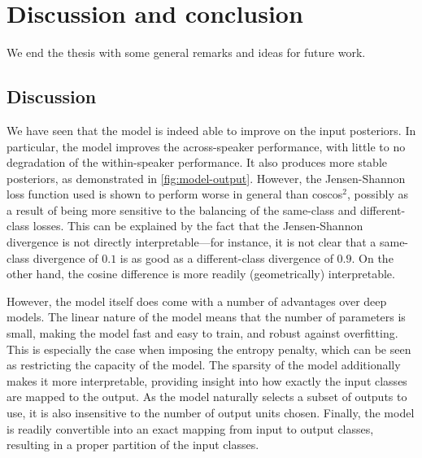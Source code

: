 %
%
%

\chapter{Discussion and conclusion}
\label{ch:discussion}

We end the thesis with some general remarks and ideas for future work.

\section{Discussion}
We have seen that the model is indeed able to improve on the input posteriors.
In particular, the model improves the across-speaker performance, with little to no degradation of the within-speaker performance.
It also produces more stable posteriors, as demonstrated in \cref{fig:model-output}.
However, the Jensen-Shannon loss function used is shown to perform worse in general than coscos$^2$, possibly as a result of being more sensitive to the balancing of the same-class and different-class losses.
This can be explained by the fact that the Jensen-Shannon divergence is not directly interpretable---for instance, it is not clear that a same-class divergence of $0.1$ is as good as a different-class divergence of $0.9$.
On the other hand, the cosine difference is more readily (geometrically) interpretable.

However, the model itself does come with a number of advantages over deep models.
The linear nature of the model means that the number of parameters is small, making the model fast and easy to train, and robust against overfitting.
This is especially the case when imposing the entropy penalty, which can be seen as restricting the capacity of the model.
The sparsity of the model additionally makes it more interpretable, providing insight into how exactly the input classes are mapped to the output.
As the model naturally selects a subset of outputs to use, it is also insensitive to the number of output units chosen.
Finally, the model is readily convertible into an exact mapping from input to output classes, resulting in a proper partition of the input classes.

